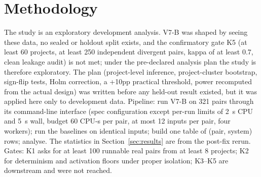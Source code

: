 \section{Methodology}\label{sec:method}
The study is an exploratory development analysis. V7-B was shaped by seeing these data, no sealed or holdout split exists, and the confirmatory gate K5 (at least 60 projects, at least 250 independent divergent pairs, kappa of at least 0.7, clean leakage audit) is not met; under the pre-declared analysis plan the study is therefore exploratory. The plan (project-level inference, project-cluster bootstrap, sign-flip tests, Holm correction, a +10pp practical threshold, power recomputed from the actual design) was written before any held-out result existed, but it was applied here only to development data. Pipeline: run V7-B on 321 pairs through its command-line interface (spec configuration except per-run limits of 2~s CPU and 5~s wall, budget 60 CPU-s per pair, at most 12 inputs per pair, four workers); run the baselines on identical inputs; build one table of (pair, system) rows; analyse. The statistics in Section~\ref{sec:results} are from the post-fix rerun. Gates: K1 asks for at least 100 runnable real pairs from at least 8 projects; K2 for determinism and activation floors under proper isolation; K3--K5 are downstream and were not reached.
